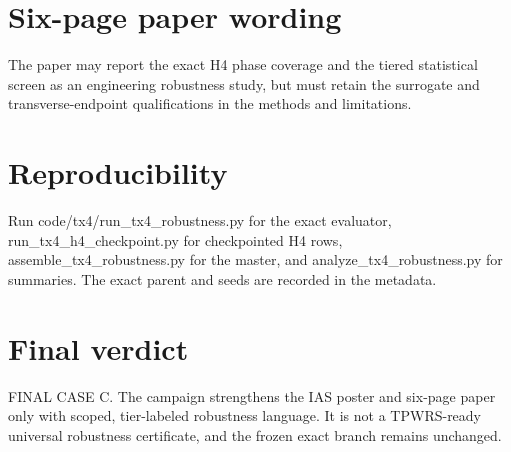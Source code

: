 \documentclass[11pt]{article}
\begin{document}
\section{Six-page paper wording}

The paper may report the exact H4 phase coverage and the tiered statistical screen as an engineering robustness study, but must retain the surrogate and transverse-endpoint qualifications in the methods and limitations.

\section{Reproducibility}

Run code/tx4/run_tx4_robustness.py for the exact evaluator, run_tx4_h4_checkpoint.py for checkpointed H4 rows, assemble_tx4_robustness.py for the master, and analyze_tx4_robustness.py for summaries. The exact parent and seeds are recorded in the metadata.

\section{Final verdict}

FINAL CASE C. The campaign strengthens the IAS poster and six-page paper only with scoped, tier-labeled robustness language. It is not a TPWRS-ready universal robustness certificate, and the frozen exact branch remains unchanged.
\end{document}
